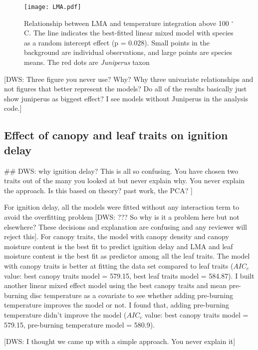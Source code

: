 \documentclass[12pt]{report}
\begin{document}
\begin{figure}
    \centering
    \texttt{[image: LMA.pdf]}
    \caption[short version]{\label{fig:LMA-tempint} Relationship between LMA and temperature integration above 100 $^{\circ}$C. The line indicates the best-fitted linear mixed model with species as a random intercept effect (p = 0.028). Small points in the background are individual observations, and large points are species means. The red dots are \emph{Juniperus} taxon}
\end{figure}


[DWS: Three figure you never use? Why? Why three univariate relationships and not figures that better represent the models? Do all of the results basically just show juniperus as biggest effect? I see models without Juniperus in the analysis code.]



\subsection{Effect of canopy and leaf traits on ignition delay}

## DWS: why ignition delay? This is all so confusing. You have chosen two traits out of the many you looked at but never explain why. You never explain the approach. Is this based on theory? past work, the PCA? ]

For ignition delay, all the models were fitted without any interaction term to avoid the overfitting problem [DWS:  ??? So why is it a problem here but not elsewhere? These decisions and explanation are confusing and any reviewer will reject this]. For canopy traits, the model with canopy density and canopy moisture content is the best fit to predict ignition delay and LMA and leaf moisture content is the best fit as predictor among all the leaf traits. The model with canopy traits is better at fitting the data set compared to leaf traits ($AIC_{c}$ value: best canopy traits model = 579.15, best leaf traits model = 584.87). I built another linear mixed effect model using the best canopy traits and  mean pre-burning disc temperature as a covariate to see whether adding pre-burning temperature improves the model or not. I found that, adding pre-burning temperature didn't improve the model ($AIC_{c}$ value: best canopy traits model = 579.15, pre-burning temperature model = 580.9).

[DWS: I thought we came up with a simple approach. You never explain it]
\end{document}

